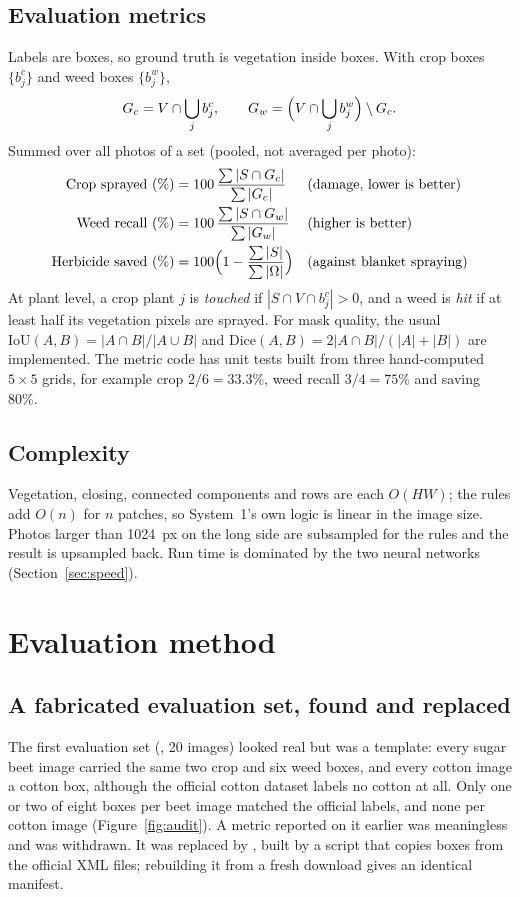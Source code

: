 \subsection{Evaluation metrics}\label{sec:math-metrics}
Labels are boxes, so ground truth is vegetation inside boxes. With crop boxes $\{b^c_j\}$ and weed
boxes $\{b^w_j\}$,
\begin{equation}
  G_c = V\cap\bigcup_j b^c_j,\qquad G_w=\Bigl(V\cap\bigcup_j b^w_j\Bigr)\setminus G_c .
\end{equation}
Summed over all photos of a set (pooled, not averaged per photo):
\begin{align}
  \text{Crop sprayed (\%)} &= 100\,\frac{\sum|S\cap G_c|}{\sum|G_c|} &&\text{(damage, lower is better)}\\
  \text{Weed recall (\%)}  &= 100\,\frac{\sum|S\cap G_w|}{\sum|G_w|} &&\text{(higher is better)}\\
  \text{Herbicide saved (\%)} &= 100\Bigl(1-\frac{\sum|S|}{\sum|\Omega|}\Bigr) &&\text{(against blanket spraying)}
\end{align}
At plant level, a crop plant $j$ is \emph{touched} if $|S\cap V\cap b^c_j|>0$, and a weed is \emph{hit}
if at least half its vegetation pixels are sprayed. For mask quality, the usual
$\mathrm{IoU}(A,B)=|A\cap B|/|A\cup B|$ and $\mathrm{Dice}(A,B)=2|A\cap B|/(|A|+|B|)$ are implemented.
The metric code has unit tests built from three hand-computed $5\times5$ grids, for example crop
$2/6=33.3\%$, weed recall $3/4=75\%$ and saving 80\%.

\subsection{Complexity}
Vegetation, closing, connected components and rows are each $O(HW)$; the rules add $O(n)$ for $n$
patches, so System~1's own logic is linear in the image size. Photos larger than 1024~px on the long
side are subsampled for the rules and the result is upsampled back. Run time is dominated by the two
neural networks (Section~\ref{sec:speed}).

\section{Evaluation method}\label{sec:evalmethod}

\subsection{A fabricated evaluation set, found and replaced}
The first evaluation set (, 20 images) looked real but was a template: every
sugar beet image carried the same two crop and six weed boxes, and every cotton image a cotton box,
although the official cotton dataset labels no cotton at all. Only one or two of eight boxes per beet
image matched the official labels, and none per cotton image (Figure~\ref{fig:audit}). A metric
reported on it earlier was meaningless and was withdrawn. It was replaced by ,
built by a script that copies boxes from the official XML files; rebuilding it from a fresh download
gives an identical manifest.

